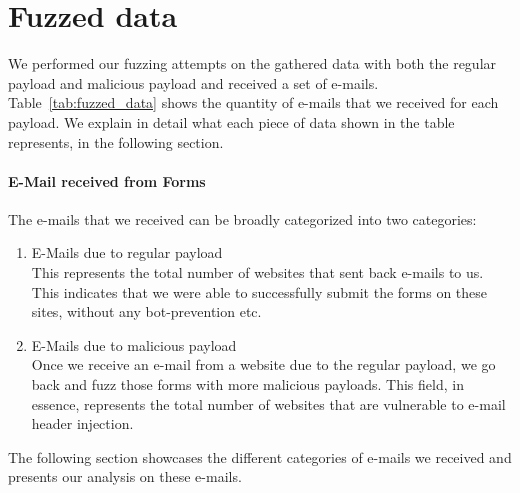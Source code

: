 \section{Fuzzed data}
We performed our fuzzing attempts on the gathered data with both the regular payload and malicious payload and received a set of e-mails. Table~\ref{tab:fuzzed_data} shows the quantity of e-mails that we received for each payload. We explain in detail what each piece of data shown in the table represents, in the following section.

\paragraph{E-Mail received from Forms}
The e-mails that we received can be broadly categorized into two categories:
\begin{enumerate}
	\item E-Mails due to regular payload\\
	This represents the total number of websites that sent back e-mails to us. This indicates that we were able to successfully submit the forms on these sites, without any bot-prevention etc.
	\item E-Mails due to malicious payload\\
    Once we receive an e-mail from a website due to the regular payload, we go back and fuzz those forms with more malicious payloads. This field, in essence, represents the total number of websites that are vulnerable to e-mail header injection.
\end{enumerate}
The following section showcases the different categories of e-mails we received and presents our analysis on these e-mails.



